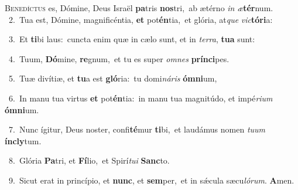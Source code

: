 \lettrine{\initial\textcolor{\initialcolor}{B}}{enedíctus} es, Dómine, Deus Israël \textbf{pa}\-tris \textbf{nos}\-tri,~\star ab ætérno \textit{in} \textit{æ}\-\textbf{tér}num.\\
{\numbfont\textcolor{\numbcolor}{~2.}}~Tua est, Dómine, magnificéntia, \textbf{et} pot\-\textbf{én}\-tia,~\star et glória, at\textit{que} \textit{vic}\-\textbf{tó}\textbf{ri}a:\par
{\numbfont\textcolor{\numbcolor}{~3.}}~Et \textbf{ti}\-bi laus:~\star cuncta enim quæ in cælo sunt, et in \textit{ter}\-\textit{ra}, \textbf{tu}\-\textbf{a} sunt:\par
{\numbfont\textcolor{\numbcolor}{~4.}}~Tuum, \textbf{Dó}\-mine, \textbf{re}\-gnum,~\star et tu es super \textit{om}\-\textit{nes} \textbf{prín}\-\textbf{ci}pes.\par
{\numbfont\textcolor{\numbcolor}{~5.}}~Tuæ divítiæ, et \textbf{tu}\-a est \textbf{gló}\-ria:~\star tu domi\-\textit{ná}\-\textit{ris} \textbf{óm}\-\textbf{ni}um,\par
{\numbfont\textcolor{\numbcolor}{~6.}}~In manu tua virtus \textbf{et} pot\-\textbf{én}\-tia:~\star in manu tua magnitúdo, et impé\-\textit{ri}\-\textit{um} \textbf{óm}\-\textbf{ni}um.\par
{\numbfont\textcolor{\numbcolor}{~7.}}~Nunc ígitur, Deus noster, confi\-\textbf{té}\-mur \textbf{ti}\-bi,~\star et laudámus nomen \textit{tu}\-\textit{um} \textbf{ín}\-\textbf{cly}tum.\par
{\numbfont\textcolor{\numbcolor}{~8.}}~Glória \textbf{Pa}\-tri, et \textbf{Fí}\-lio,~\star et Spirí\-\textit{tu}\-\textit{i} \textbf{Sanc}\-to.\par
{\numbfont\textcolor{\numbcolor}{~9.}}~Sicut erat in princípio, et \textbf{nunc}\-, et \textbf{sem}\-per,~\star et in sǽcula sæcu\-\textit{ló}\-\textit{rum}. \textbf{A}\-men.\par
